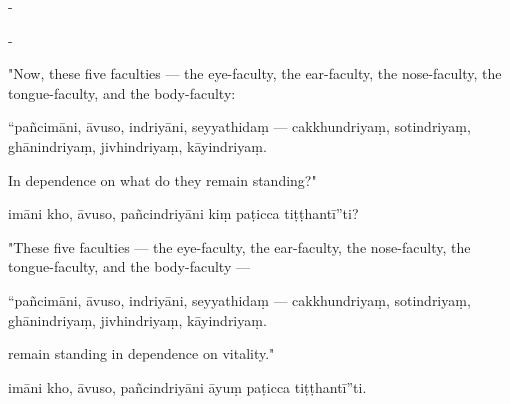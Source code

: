 \begin{samepage}
\begin{leftcolumn*}
-
\end{leftcolumn*}

\begin{rightcolumn}
-
\end{rightcolumn}
\end{samepage}

\begin{samepage}
\begin{leftcolumn*}
"Now, these five faculties — the eye-faculty, the ear-faculty, the nose-faculty, the tongue-faculty, and the body-faculty:
\end{leftcolumn*}

\begin{rightcolumn}
“pañcimāni, āvuso, indriyāni, seyyathidaṃ — cakkhundriyaṃ, sotindriyaṃ, ghānindriyaṃ, jivhindriyaṃ, kāyindriyaṃ.
\end{rightcolumn}
\end{samepage}

\begin{samepage}
\begin{leftcolumn*}
In dependence on what do they remain standing?"
\end{leftcolumn*}

\begin{rightcolumn}
imāni kho, āvuso, pañcindriyāni kiṃ paṭicca tiṭṭhantī”ti?
\end{rightcolumn}
\end{samepage}

\begin{samepage}
\begin{leftcolumn*}
"These five faculties — the eye-faculty, the ear-faculty, the nose-faculty, the tongue-faculty, and the body-faculty —
\end{leftcolumn*}

\begin{rightcolumn}
“pañcimāni, āvuso, indriyāni, seyyathidaṃ — cakkhundriyaṃ, sotindriyaṃ, ghānindriyaṃ, jivhindriyaṃ, kāyindriyaṃ.
\end{rightcolumn}
\end{samepage}

\begin{samepage}
\begin{leftcolumn*}
remain standing in dependence on vitality."
\end{leftcolumn*}

\begin{rightcolumn}
imāni kho, āvuso, pañcindriyāni āyuṃ paṭicca tiṭṭhantī”ti.
\end{rightcolumn}
\end{samepage}

